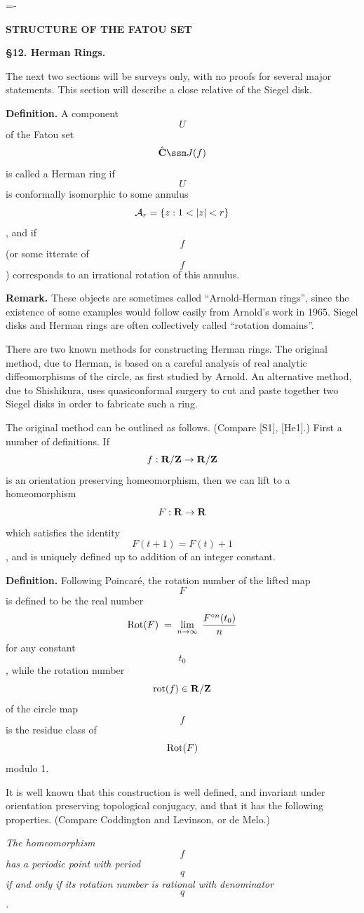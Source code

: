 

\def\rot{{\rm rot}}
\def\Rot{{\rm Rot}}

\footline={\hss{}-\folio\hss}

\centerline{\bf STRUCTURE OF THE FATOU SET}\bigskip

\centerline{\bf \S12. Herman Rings.}\medskip

The next two sections will be surveys only, with no proofs for several
major statements. This section
will describe a close relative of the Siegel disk.\smallskip

{\bf Definition.} A component \[U\] of the Fatou set \[\hat\C\ssm J(f)\] is
called a
{\bit Herman ring} if \[U\] is conformally isomorphic to some annulus
\[{\cal A}_r=\{z:1<|z|<r\}\], and if \[f\] (or some itterate of \[f\])
corresponds to an irrational rotation of this annulus.

{\bf Remark.} These objects are sometimes called
``Arnold-Herman rings'', since the existence of some examples would follow 
easily from Arnold's work in 1965.
Siegel disks and Herman rings are often collectively called
``{\bit rotation domains}''.

There are two known methods for constructing Herman rings. The original
method, due to Herman, is based on a careful analysis of real analytic
diffeomorphisms of the circle, as first studied by Arnold. An alternative
method, due to Shishikura, uses quasiconformal
surgery to cut and paste together two Siegel disks in order to fabricate
such a ring.

The original method can be outlined as follows. (Compare [S1], [He1].)
First a
number of definitions. If \[f:{\bf R}/{\bf Z}\to {\bf R}/{\bf Z}\] is an orientation
preserving homeomorphism, then we can lift to a homeomorphism \[F:{\bf R}\to{\bf R}\]
which satisfies the identity \[F(t+1)=F(t)+1\], and
is uniquely defined up to addition of an integer constant.\smallskip

{\bf Definition.} Following Poincar\'e, the {\bit rotation number}
of the lifted map \[F\] is defined to be the real number
$$	\Rot(F)\;=\;\lim_{n\to\infty}\; {F^{\circ n}(t_0)\over n}	$$
for any constant \[t_0\],
while the rotation number \[\;\rot(f)\in\R/\Z\;\] of the circle map \[f\]
is the residue class of \[\Rot(F)\] modulo 1.\smallskip

It is well known that this construction is well defined, and invariant
under orientation preserving topological conjugacy, and that it has
the following properties. (Compare Coddington and Levinson, or de Melo.)

{ {\it The homeomorphism \[f\]
has a periodic point with period \[q\] if and only if its rotation number
is rational with denominator \[q\].}\smallskip}

